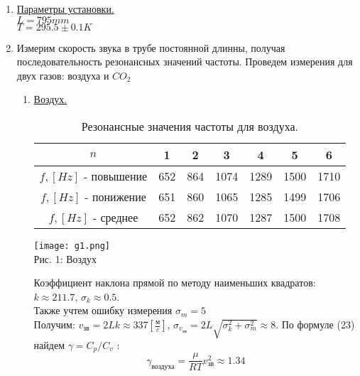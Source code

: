 \documentclass[10pt]{article}
\begin{document}
    \begin{enumerate}
    \item \underline{Параметры установки.} \\
        $L = 795mm$ \\
        $T = 295.5\pm0.1K$
    \item 
        Измерим скорость звука в трубе постоянной длинны, получая последовательность резонансных значений частоты.
        Проведем измерения для двух газов: воздуха и $CO_2$
        \begin{enumerate}
        \item \underline{Воздух.} 
            \begin{table}[h]
                    \caption{Резонансные значения частоты для воздуха.}
                    \begin{center}
                    \begin{tabular}{|c|c|c|c|c|c|c|}
                            \hline 
                                $n$ & 1 & 2 & 3 & 4 & 5 & 6 \\
                            \hline
                                $f , [Hz]$ - повышение &652&864&1074&1289&1500&1710\\
                            \hline
                                $f , [Hz]$ - понижение &651&860&1065&1285&1499&1706\\
                            \hline
                                $f , [Hz]$ - среднее &652&862&1070&1287&1500&1708 \\
                            \hline
                            \end{tabular}
                        \end{center}
            \end{table}
            \begin{center} 
                \texttt{[image: g1.png]} 
                \\ Рис. 1: Воздух
            \end{center}

            Коэффициент наклона прямой по методу наименьших квадратов:  
                \indent $k \approx 211.7$, \quad $\sigma_k \approx 0.5$. \\
            Также учтем ошибку измерения $\sigma_{m} = 5$ \\
            Получим: 
                \indent $v_\text{зв} = 2L k \approx 337 \left[\frac{\text{м}}{c}\right]$, \quad 
             $\sigma_{v_\text{зв}} = 2L \sqrt{\sigma_{k}^2 + \sigma_{m}^2} \approx 8$.
            По формуле (23) найдем $\gamma = C_p/C_v$ :
            \begin{equation}
                \gamma_{\text{воздуха}} = \frac{\mu}{RT}v_\text{зв}^2 \approx 1.34  
            \end{equation}
            

\end{enumerate}
\end{enumerate}
\end{document}
